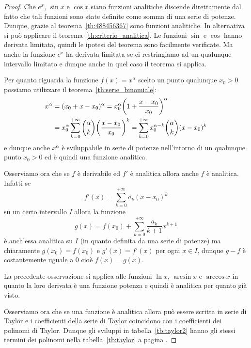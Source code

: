 \begin{proof}
  Che $e^x$, $\sin x$ e $\cos x$ siano funzioni analitiche discende direttamente
  dal fatto che tali funzioni sono state definite come somma di una serie
  di potenze.
  Dunque, grazie al teorema~\ref{th:488456367} sono funzioni
  analitiche.
  In alternativa si può applicare il teorema~\ref{th:criterio_analitica}. Le funzioni
  $\sin$ e $\cos$ hanno derivata limitata, quindi le ipotesi del teorema
  sono facilmente verificate. Ma anche la funzione $e^x$ ha derivata limitata
  se ci restringiamo ad un qualunque intervallo limitato e dunque anche in quel
  caso il teorema si applica.

  Per quanto riguarda la funzione $f(x)=x^\alpha$ scelto un punto qualunque $x_0>0$
  possiamo utilizzare il teorema~\ref{th:serie_binomiale}:
    \begin{align*}
    x^\alpha
    &= (x_0 + x-x_0)^\alpha
    = x_0^\alpha {\left( 1+\frac {x-x_0} {x_0} \right)}^\alpha \\
    &= x_0^\alpha \sum_{k=0}^{+\infty} {\alpha \choose k} {\left( \frac{x-x_0}{x_0} \right)}^k
    = \sum_{k=0}^{+\infty} x_0^{\alpha-k}{\alpha \choose k} (x-x_0)^k
  \end{align*}
  e dunque anche $x^\alpha$ è sviluppabile in serie di potenze
  nell'intorno di un qualunque punto $x_0>0$ ed è quindi una
  funzione analitica.

  Osserviamo ora che se $f$ è derivabile ed $f'$ è analitica
  allora anche
  $f$ è analitica. Infatti se
  \[
    f'(x) = \sum_{k=0}^{+\infty} a_k (x-x_0)^k
  \]
  su un certo intervallo $I$
  allora la funzione
  \begin{equation}\label{eq:4569903}
    g(x) = f(x_0) + \sum_{k=0}^{+\infty} \frac{a_k}{k+1}x^{k+1}
  \end{equation}
  è anch'essa analitica su $I$ (in quanto definita da una serie di potenze)
  ma chiaramente $g(x_0) = f(x_0)$ e $g'(x) = f'(x)$ per ogni $x\in I$,
  dunque $g-f$ è costantemente uguale a $0$ cioè $f(x) = g(x)$.

  La precedente osservazione si applica alle funzioni $\ln x$, $\arcsin x$ e
  $\arccos x$ in quanto la loro derivata è una funzione potenza e quindi
  è analitica per quanto già visto.

  Osserviamo ora che se una funzione è analitica allora può essere scritta
  in serie di Taylor e i coefficienti della serie di Taylor coincidono
  con i coefficienti dei polinomi di Taylor. Dunque gli sviluppi
  in tabella~\ref{tb:taylor2} hanno gli stessi termini dei polinomi
  nella tabella~\ref{tb:taylor} a pagina \pageref{tb:taylor}.
  \end{proof}

